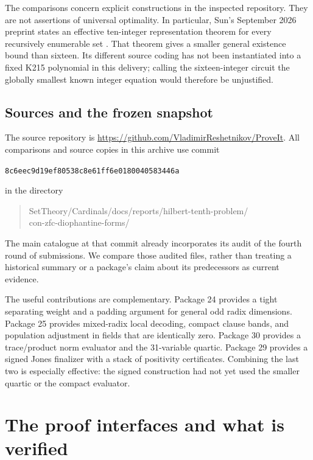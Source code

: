 \documentclass[11pt]{article}
\theoremstyle{definition}\newtheorem{definition}[theorem]{Definition}
\theoremstyle{remark}\newtheorem{remark}[theorem]{Remark}
\newcommand{\pin}{\texttt{8c6eec9d19ef80538c8e61ff6e0180040583446a}}
\newcommand{\repo}{\url{https://github.com/VladimirReshetnikov/ProveIt}}
\begin{document}
The comparisons concern explicit constructions in the inspected repository.
They are not assertions of universal optimality. In particular, Sun's
September 2026 preprint states an effective ten-integer representation
theorem for every recursively enumerable set \cite{sun10}. That theorem
gives a smaller general existence bound than sixteen. Its different
source coding has not been instantiated into a fixed K215 polynomial in
this delivery; calling the sixteen-integer circuit the globally smallest
known integer equation would therefore be unjustified.

\subsection{Sources and the frozen snapshot}

The source repository is \repo. All comparisons and source copies in this
archive use commit\par
\begin{center}\small\pin\end{center}
in the directory
\begin{quote}\small\ttfamily
SetTheory/Cardinals/docs/reports/hilbert-tenth-problem/\\
con-zfc-diophantine-forms/
\end{quote}
The main catalogue at that commit
already incorporates its audit of the fourth round of submissions.
We compare those audited files, rather than treating a historical
summary or a package's claim about its predecessors as current evidence.

The useful contributions are complementary. Package 24 provides a tight
separating weight and a padding argument for general odd radix dimensions.
Package 25 provides mixed-radix local decoding, compact clause bands, and
population adjustment in fields that are identically zero. Package 30
provides a trace/product norm evaluator and the 31-variable quartic.
Package 29 provides a signed Jones finalizer with a stack of positivity
certificates. Combining the last two is especially effective: the signed
construction had not yet used the smaller quartic or the compact evaluator.

\section{The proof interfaces and what is verified}
\label{sec:interfaces}
\end{document}
